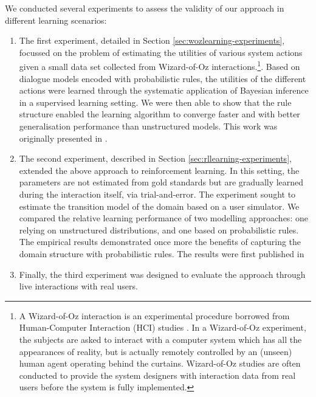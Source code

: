 We conducted several experiments to assess the validity of our approach in different learning scenarios: \begin{enumerate}
\item The first experiment, detailed in Section \ref{sec:wozlearning-experiments}, focussed on the problem of estimating the utilities of various system actions given a small data set collected from Wizard-of-Oz interactions.\footnote{A Wizard-of-Oz interaction is an experimental procedure borrowed from Human-Computer Interaction (HCI) studies \citep{woz93}. In a Wizard-of-Oz experiment, the subjects are asked to interact with a computer system which has all the appearances of reality, but is actually remotely controlled by an (unseen) human agent operating behind the curtains.  Wizard-of-Oz studies are often conducted to provide the system designers with interaction data from real users before the system is fully implemented.}.  Based on dialogue models encoded with probabilistic rules, the utilities of the different actions were learned through the systematic application of Bayesian inference in a supervised learning setting.  We were then able to show that the rule structure enabled the learning algorithm to converge faster and with better generalisation performance than unstructured models. This work was originally presented in \citep{rulebasedmodels-sigdial2012}.
\item The second experiment, described in Section \ref{sec:rllearning-experiments}, extended the above approach to reinforcement learning.  In this setting, the parameters are not estimated from gold standards but are gradually learned during the interaction itself, via trial-and-error.  The experiment sought to estimate the transition model of the domain based on a user simulator. We compared the relative learning performance of two modelling approaches: one relying on unstructured distributions, and one based on probabilistic rules. The empirical results demonstrated once more the benefits of capturing the domain structure with probabilistic rules. The results were first published in  
\item Finally, the third experiment was designed to evaluate the approach through live interactions with real users. 
\end{enumerate}

